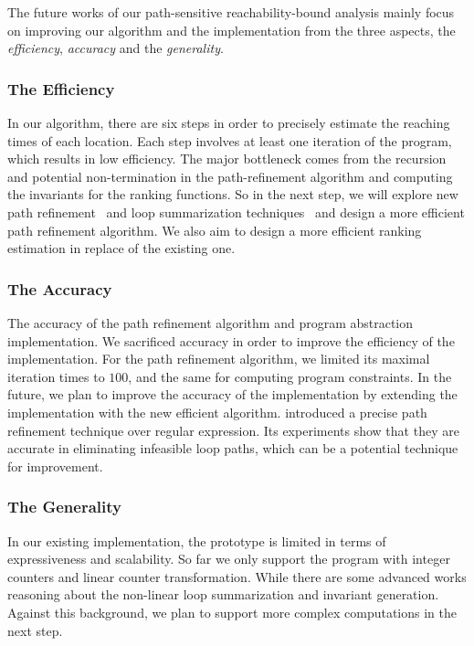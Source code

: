 The future works of our {path-sensitive} reachability-bound analysis
mainly focus on improving our algorithm and the implementation
from the three aspects,
the \emph{efficiency}, \emph{accuracy} and the \emph{generality}.

\subsubsection{The Efficiency} 
In our algorithm, there are six steps in order to precisely estimate the reaching times of each location. Each step involves at least one iteration of the program, which results in low efficiency.
The major bottleneck comes from the recursion and potential non-termination in the path-refinement algorithm and computing the invariants for the ranking functions. So in the next step, we will explore new path refinement~\cite{CyphertBKR19} and loop summarization techniques~\cite{BreckCKR20,KincaidBCR19,KincaidCBR18} and design a more efficient path refinement algorithm. We also aim to design a more efficient ranking estimation in replace of the existing one.

\subsubsection{The Accuracy} 
The accuracy of the path refinement algorithm and program abstraction implementation.
We sacrificed accuracy in order to improve the efficiency of the implementation. For the path refinement algorithm,
we limited its maximal iteration times to $100$, and the same for computing program constraints. 
In the future, we plan to improve the accuracy of the implementation by extending the implementation with the new efficient algorithm.
\cite{CyphertBKR19} introduced a precise path refinement technique over regular expression. Its experiments show that they are accurate in eliminating infeasible loop paths, which can be a potential technique for improvement.

\subsubsection{The Generality}
In our existing implementation, the prototype is limited in terms of expressiveness and scalability. So far we only support the program with integer counters and linear counter transformation. While there are some advanced works reasoning about the non-linear loop summarization and invariant generation. Against this background, we plan to support more complex computations in the next step.


